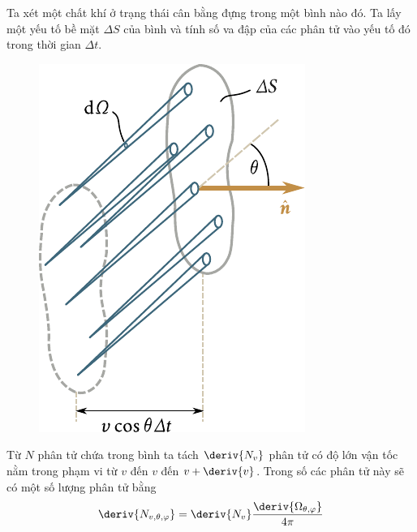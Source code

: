 Ta xét một chất khí ở trạng thái cân bằng đựng trong một bình nào đó. Ta lấy một yếu tố bề mặt $\Delta S$ của bình và tính số va đập của các phân tử vào yếu tố đó trong thời gian $\Delta t$.
\noindent 
\begin{figure}[!htb]
	\begin{center}
		\includegraphics[scale=1.0]{figures/ch_11/fig_11_5.pdf}
		\caption[]{}
		\label{fig:11_5}
	\end{center}
	\vspace{-0.8cm}
\end{figure}

Từ $N$ phân tử chứa trong bình ta tách $\deriv{N_v}$ phân tử có độ lớn vận tốc nằm trong phạm vi từ $v$ đến $v$ đến $v+\deriv{v}$. Trong số các phân tử này sẽ có một số lượng phân tử bằng
\begin{equation}\label{eq:11_18}
	\deriv{N_{v,\theta,\varphi}} = \deriv{N_v} \frac{\deriv{\Omega_{\theta,\varphi}}}{4\pi}
\end{equation}

